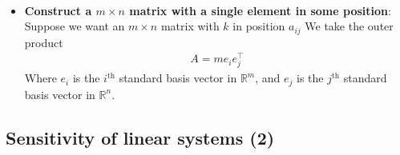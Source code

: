 \documentclass{report}
\begin{document}
\begin{itemize}
\begin{align*}
            \end{align*}
        \item \textbf{Construct a $m\times n$ matrix with a single element in some position}: Suppose we want an $m\times n$ matrix with $k$ in position $a_{ij}$ We take the outer product
            \begin{align*}
               A = me_{i}e_{j}^{\top}
            \end{align*}
            Where $e_{i}$ is the $i^{\text{th}} $ standard basis vector in $\mathbb{R}^{m}$, and $e_{j}$ is the $j^{\text{th}}$ standard basis vector in $\mathbb{R}^{n}$.

    \end{itemize}

    \pagebreak 
    \subsection{Sensitivity of linear systems (2)}
    \bigbreak \noindent 
\end{document}
